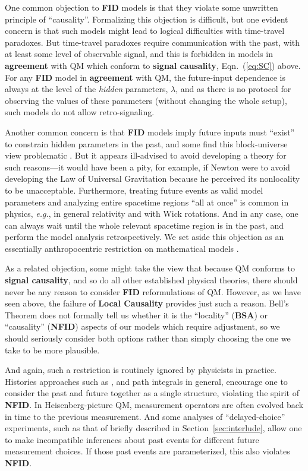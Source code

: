 \documentclass[rmp, aps, preprint, longbibliography]{revtex4-1}
\begin{document}
One common objection to {\bf FID} models is that they violate some unwritten principle of ``causality''.  Formalizing this objection is difficult, but one evident concern is that such models might lead to logical difficulties with time-travel paradoxes.  But time-travel paradoxes require communication with the past, with at least some level of observable signal, and this is forbidden in models in {\bf agreement} with QM which conform to {\bf signal causality}, Eqn.~(\ref{eq:SC}) above.  For any {\bf FID} model in {\bf agreement} with QM, the future-input dependence is always at the level of the {\em hidden} parameters, $\lambda$, and as there is no protocol for observing the values of these parameters (without changing the whole setup), such models do not allow retro-signaling.

Another common concern is that {\bf FID} models imply future inputs must ``exist'' to constrain hidden parameters in the past, and some find this block-universe view problematic \cite{sorkin2007,kastner2017}.  But it appears ill-advised to avoid developing a theory for such reasons---it would have been a pity, for example, if Newton were to avoid developing the Law of Universal Gravitation because he perceived its nonlocality to be unacceptable.  Furthermore, treating future events as valid model parameters and analyzing entire spacetime regions ``all at once'' is common in physics, \emph{e.g.}, in general relativity and with Wick rotations.  And in any case, one can always wait until the whole relevant spacetime region is in the past, and perform the model analysis retrospectively.  We set aside this objection as an essentially anthropocentric restriction on mathematical models \cite{wharton2015a}.

As a related objection, some might take the view that because QM conforms to {\bf signal causality}, and so do all other established physical theories, there should never be any reason to consider {\bf FID} reformulations of QM.  However, as we have seen above, the failure of {\bf Local Causality} provides just such a reason.  Bell's Theorem does not formally tell us whether it is the ``locality'' ({\bf BSA}) or ``causality'' ({\bf NFID}) aspects of our models which require adjustment, so we should seriously consider both options rather than simply choosing the one we take to be more plausible.

And again, such a restriction is routinely ignored by physicists in practice.  Histories approaches such as \textcite{griffiths2001}, and path integrals in general, encourage one to consider the past and future together as a single structure, violating the spirit of {\bf NFID}.  In Heisenberg-picture QM, measurement operators are often evolved back in time to the previous measurement. And some analyses of ``delayed-choice'' experiments, such as that of \textcite{bohr1935} briefly described in Section~\ref{sec:interlude}, allow one to make incompatible inferences about past events for different future measurement choices.  If those past events are parameterized, this also violates {\bf NFID}.  
\end{document}
